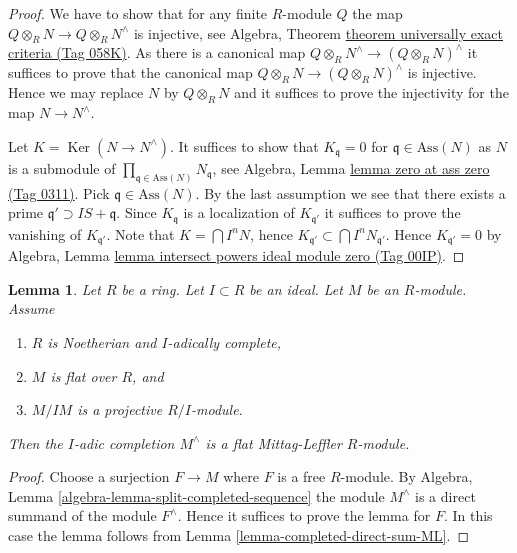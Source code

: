 \documentclass{amsart}
\theoremstyle{plain}
\newtheorem{lemma}[subsection]{Lemma}
\theoremstyle{definition}
\theoremstyle{remark}
\numberwithin{equation}{subsection}
\def\Ker{\mathop{\mathrm{Ker}}}
\begin{document}
\begin{proof}
We have to show that for any finite $R$-module $Q$ the map
$Q \otimes_R N \to Q \otimes_R N^\wedge$ is injective, see
Algebra, Theorem \href{https://stacks.math.columbia.edu/tag/058K}{theorem universally exact criteria (Tag 058K)}.
As there is a canonical map $Q \otimes_R N^\wedge \to (Q \otimes_R N)^\wedge$
it suffices to prove that the canonical map
$Q \otimes_R N \to (Q \otimes_R N)^\wedge$ is injective.
Hence we may replace $N$ by $Q \otimes_R N$ and it suffices to prove the
injectivity for the map $N \to N^\wedge$.

\medskip\noindent
Let $K = \Ker(N \to N^\wedge)$. It suffices to show that
$K_{\mathfrak q} = 0$ for $\mathfrak q \in \text{Ass}(N)$ as $N$ is a
submodule of $\prod_{\mathfrak q \in \text{Ass}(N)} N_{\mathfrak q}$, see
Algebra, Lemma \href{https://stacks.math.columbia.edu/tag/0311}{lemma zero at ass zero (Tag 0311)}.
Pick $\mathfrak q \in \text{Ass}(N)$. By the last assumption we see that
there exists a prime $\mathfrak q' \supset IS + \mathfrak q$.
Since $K_{\mathfrak q}$ is a localization of $K_{\mathfrak q'}$
it suffices to prove the vanishing of $K_{\mathfrak q'}$.
Note that $K = \bigcap I^nN$, hence
$K_{\mathfrak q'} \subset \bigcap I^nN_{\mathfrak q'}$.
Hence $K_{\mathfrak q'} = 0$ by
Algebra, Lemma \href{https://stacks.math.columbia.edu/tag/00IP}{lemma intersect powers ideal module zero (Tag 00IP)}.
\end{proof}


\begin{lemma}
\label{lemma-lift-ML}
Let $R$ be a ring. Let $I \subset R$ be an ideal.
Let $M$ be an $R$-module.
Assume
\begin{enumerate}
\item $R$ is Noetherian and $I$-adically complete,
\item $M$ is flat over $R$, and
\item $M/IM$ is a projective $R/I$-module.
\end{enumerate}
Then the $I$-adic completion $M^\wedge$ is a flat Mittag-Leffler
$R$-module.
\end{lemma}

\begin{proof}
Choose a surjection $F \to M$ where $F$ is a free $R$-module. By
Algebra, Lemma \ref{algebra-lemma-split-completed-sequence}
the module $M^\wedge$ is a direct summand of the module $F^\wedge$.
Hence it suffices to prove the lemma for $F$.
In this case the lemma follows from
Lemma \ref{lemma-completed-direct-sum-ML}.
\end{proof}
\end{document}
